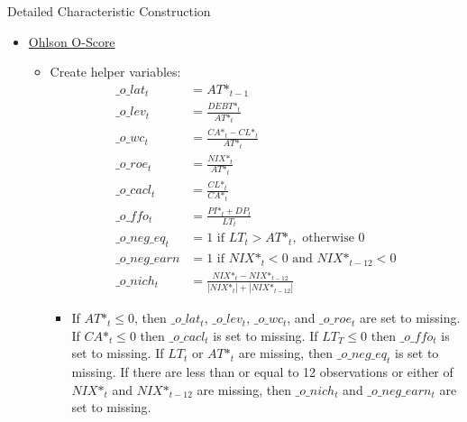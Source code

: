 \documentclass[12pt,title,fleqn]{article}
\begin{document}
\begin{section}{Detailed Characteristic Construction}
\begin{itemize}
\begin{itemize}
                \item Characteristic\footnote{A subscript of $ > 0$, ex: ${VAR_t}_{>0, t}$, is a dummy for if the variable is greater than zero, and it is defined similarly for ${VAR_t}_{<0, t}$ or any other specification. Otherwise, not included as an input, Also, if any variables other than \_f\_eqis$_t$ are missing, then f\_score$_t$ is set to missing.} 
                    \begin{align*}
                        f\_score_t =& \_f\_roa_{>0, t} + \_f\_croa_{>0, t} + \_f\_droa_{>0, t} + \_f\_acc_{>0, t} + \\ &\_f\_lev_{<0, t} + \_f\_liq_{>0, t} + \_f\_eqis_{=0, t} + \_f\_gm_{>0, t} + \_f\_aturn_{>0, t}
                    \end{align*}
            \end{itemize}
        
        \item \hyperlink{ohl2}{\hypertarget{ohl}{Ohlson O-Score}}
            \begin{itemize}
                \item Create helper variables:
                \begin{align*}
                    \_o\_lat_t &= AT\mbox{*}_{t-1} \\
                    \_o\_lev_t &= \frac{DEBT\mbox{*}_t}{AT\mbox{*}_t} \\
                    \_o\_wc_t &= \frac{CA\mbox{*}_t - CL\mbox{*}_t}{AT\mbox{*}_t}  \\
                    \_o\_roe_t &= \frac{NIX\mbox{*}_t}{AT\mbox{*}_t} \\
                    \_o\_cacl_t &= \frac{CL\mbox{*}_t}{CA\mbox{*}_t} \\
                    \_o\_ffo_t &= \frac{PI\mbox{*}_t + DP_t}{LT_t} \\
                    \_o\_neg\_eq_t &= 1 \text{ if } LT_t > AT\mbox{*}_t, \text{ otherwise } 0 \\
                    \_o\_neg\_earn &= 1 \text{ if } NIX\mbox{*}_t < 0 \text{ and } NIX\mbox{*}_{t-12} < 0 \\
                    \_o\_nich_t &= \frac{NIX\mbox{*}_t - NIX\mbox{*}_{t-12}}{|NIX\mbox{*}_t| +  |NIX\mbox{*}_{t-12}|} 
            \end{align*}
            
                \begin{itemize}
                    \item If $AT\mbox{*}_t \leq 0$, then $\_o\_lat_t$, $\_o\_lev_t$, $\_o\_wc_t$, and $\_o\_roe_t$ are set to missing. If $CA\mbox{*}_t \leq 0$ then $\_o\_cacl_t$ is set to missing. If $LT_T \leq 0$ then $\_o\_ffo_t$ is set to missing. If $LT_t$ or $AT\mbox{*}_t$ are missing, then $\_o\_neg\_eq_t$ is set to missing. If there are less than or equal to 12 observations or either of $NIX\mbox{*}_t$ and $NIX\mbox{*}_{t-12}$ are missing, then $\_o\_nich_t$ and $\_o\_neg\_earn_t$ are set to missing.
                \end{itemize}
            

\end{itemize}
\end{itemize}
\end{section}
\end{document}
